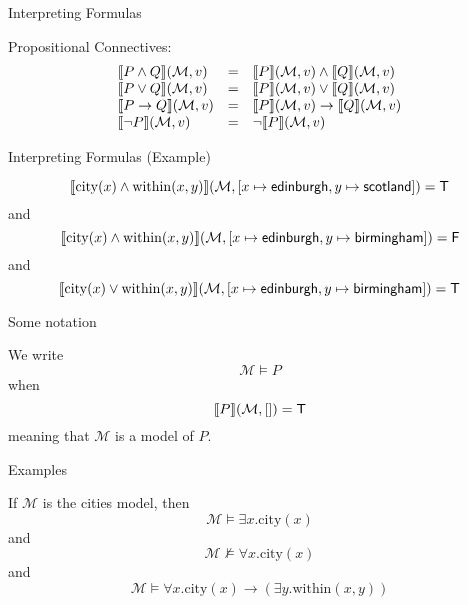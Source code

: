\documentclass[xetex,aspectratio=169,14pt,hyperref={pdfpagelabels=true,pdflang={en-GB}}]{beamer}
\begin{document}
\begin{frame}
  {Interpreting Formulas}

  Propositional Connectives:
  \begin{displaymath}
    \begin{array}{lcl}
      \llbracket P \land Q \rrbracket(\mathcal{M},v) &=& \llbracket P \rrbracket(\mathcal{M},v) \land \llbracket Q \rrbracket(\mathcal{M},v)\\
      \llbracket P \lor Q \rrbracket(\mathcal{M},v) &=& \llbracket P \rrbracket(\mathcal{M},v) \lor \llbracket Q \rrbracket(\mathcal{M},v)\\
      \llbracket P \to Q \rrbracket(\mathcal{M},v) &=& \llbracket P \rrbracket(\mathcal{M},v) \to \llbracket Q \rrbracket(\mathcal{M},v)\\
      \llbracket \lnot P \rrbracket(\mathcal{M},v) &=& \lnot \llbracket P \rrbracket(\mathcal{M},v)  \\
    \end{array}
  \end{displaymath}
\end{frame}

\begin{frame}
  {Interpreting Formulas (Example)}

  \begin{displaymath}
    \llbracket \mathrm{city}(x) \land \mathrm{within}(x,y) \rrbracket(\mathcal{M},[x\mapsto\mathsf{edinburgh},y\mapsto\mathsf{scotland}]) = \mathsf{T}
  \end{displaymath}
  and
  \begin{displaymath}
    \llbracket \mathrm{city}(x) \land \mathrm{within}(x,y) \rrbracket(\mathcal{M},[x\mapsto\mathsf{edinburgh},y\mapsto\mathsf{birmingham}]) = \mathsf{F}
  \end{displaymath}
  and
  \begin{displaymath}
    \llbracket \mathrm{city}(x) \lor \mathrm{within}(x,y) \rrbracket(\mathcal{M},[x\mapsto\mathsf{edinburgh},y\mapsto\mathsf{birmingham}]) = \mathsf{T}
  \end{displaymath}
\end{frame}

\begin{frame}
  {Some notation}

  We write
  \begin{displaymath}
    \mathcal{M} \models P
  \end{displaymath}
  when
  \begin{displaymath}
    \llbracket P \rrbracket(\mathcal{M}, []) = \mathsf{T}
  \end{displaymath}
  meaning that $\mathcal{M}$ is a model of $P$.
\end{frame}

\begin{frame}
  {Examples}

  If $\mathcal{M}$ is the cities model, then
  \begin{displaymath}
    \mathcal{M} \models \exists x. \mathrm{city}(x)
  \end{displaymath}
  and
  \begin{displaymath}
    \mathcal{M} \not\models \forall x. \mathrm{city}(x)
  \end{displaymath}
  and
  \begin{displaymath}
    \mathcal{M} \models \forall x. \mathrm{city}(x) \to (\exists y. \mathrm{within}(x,y))
  \end{displaymath}
\end{frame}
\end{document}
